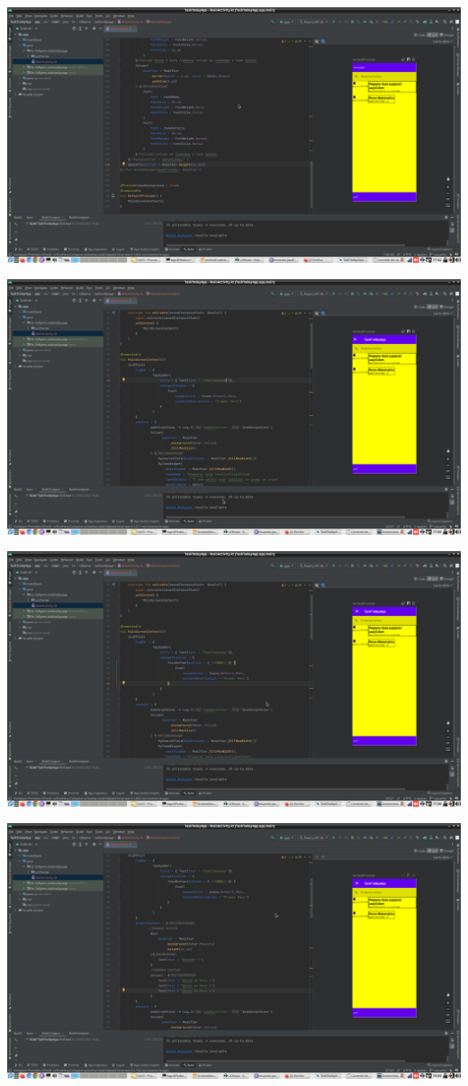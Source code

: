 \documentclass[11pt]{article}
\begin{document}
\begin{center}
\includegraphics[width=.9\linewidth]{./Captura de tela de 2023-03-29 17-42-07.png}
\end{center}
\begin{center}
\includegraphics[width=.9\linewidth]{./Captura de tela de 2023-03-29 17-55-48.png}
\end{center}
\begin{center}
\includegraphics[width=.9\linewidth]{./Captura de tela de 2023-03-29 17-56-48.png}
\end{center}
\begin{center}
\includegraphics[width=.9\linewidth]{./Captura de tela de 2023-03-29 18-04-54.png}
\end{center}
\end{document}
